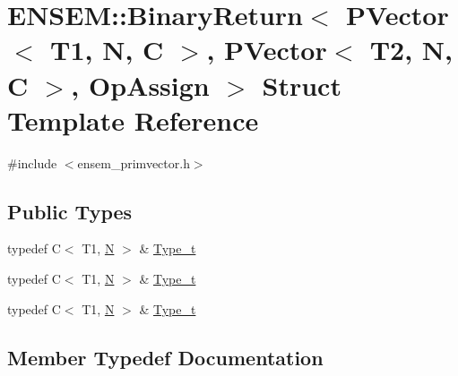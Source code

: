 \hypertarget{structENSEM_1_1BinaryReturn_3_01PVector_3_01T1_00_01N_00_01C_01_4_00_01PVector_3_01T2_00_01N_00_01C_01_4_00_01OpAssign_01_4}{}\section{E\+N\+S\+EM\+:\+:Binary\+Return$<$ P\+Vector$<$ T1, N, C $>$, P\+Vector$<$ T2, N, C $>$, Op\+Assign $>$ Struct Template Reference}
\label{structENSEM_1_1BinaryReturn_3_01PVector_3_01T1_00_01N_00_01C_01_4_00_01PVector_3_01T2_00_01N_00_01C_01_4_00_01OpAssign_01_4}


{\ttfamily \#include $<$ensem\+\_\+primvector.\+h$>$}

\subsection*{Public Types}
\begin{DoxyCompactItemize}
\item 
typedef C$<$ T1, \mbox{\hyperlink{adat__devel_2lib_2hadron_2operator__name__util_8cc_a7722c8ecbb62d99aee7ce68b1752f337}{N}} $>$ \& \mbox{\hyperlink{structENSEM_1_1BinaryReturn_3_01PVector_3_01T1_00_01N_00_01C_01_4_00_01PVector_3_01T2_00_01N_00_01C_01_4_00_01OpAssign_01_4_ab92f3a943ce4a9d7eab7e1e03279ec31}{Type\+\_\+t}}
\item 
typedef C$<$ T1, \mbox{\hyperlink{adat__devel_2lib_2hadron_2operator__name__util_8cc_a7722c8ecbb62d99aee7ce68b1752f337}{N}} $>$ \& \mbox{\hyperlink{structENSEM_1_1BinaryReturn_3_01PVector_3_01T1_00_01N_00_01C_01_4_00_01PVector_3_01T2_00_01N_00_01C_01_4_00_01OpAssign_01_4_ab92f3a943ce4a9d7eab7e1e03279ec31}{Type\+\_\+t}}
\item 
typedef C$<$ T1, \mbox{\hyperlink{adat__devel_2lib_2hadron_2operator__name__util_8cc_a7722c8ecbb62d99aee7ce68b1752f337}{N}} $>$ \& \mbox{\hyperlink{structENSEM_1_1BinaryReturn_3_01PVector_3_01T1_00_01N_00_01C_01_4_00_01PVector_3_01T2_00_01N_00_01C_01_4_00_01OpAssign_01_4_ab92f3a943ce4a9d7eab7e1e03279ec31}{Type\+\_\+t}}
\end{DoxyCompactItemize}


\subsection{Member Typedef Documentation}
\mbox{\label{structENSEM_1_1BinaryReturn_3_01PVector_3_01T1_00_01N_00_01C_01_4_00_01PVector_3_01T2_00_01N_00_01C_01_4_00_01OpAssign_01_4_ab92f3a943ce4a9d7eab7e1e03279ec31}} 
